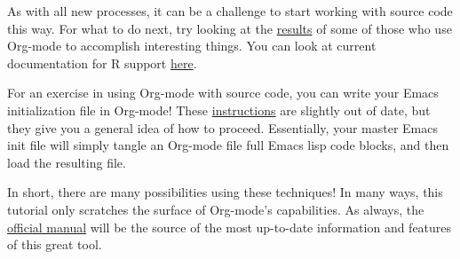 \documentclass[11pt]{article}
\begin{document}
As with all new processes, it can be a challenge to start working with source code this way.  For what to do next, try looking at the \href{http://orgmode.org/worg/org-contrib/babel/uses.php}{results} of some of those who use Org-mode to accomplish interesting things. You can look at current documentation for R support \href{http://orgmode.org/worg/org-contrib/babel/languages/ob-doc-R.php}{here}.

For an exercise in using Org-mode with source code, you can write your Emacs initialization file in Org-mode! These \href{http://orgmode.org/worg/org-contrib/babel/intro.php#sec-8_2_1}{instructions} are slightly out of date, but they give you a general idea of how to proceed. Essentially, your master Emacs init file will simply tangle an Org-mode file full Emacs lisp code blocks, and then load the resulting file.

In short, there are many possibilities using these techniques! In many ways, this tutorial only scratches the surface of Org-mode's capabilities. As always, the \href{http://orgmode.org/manual/index.html#Top}{official manual} will be the source of the most up-to-date information and features of this great tool.
\end{document}
